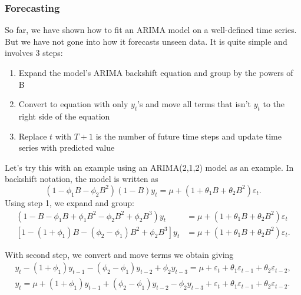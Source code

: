 \documentclass{article}
\begin{document}
  \subsubsection{Forecasting}
  So far, we have shown how to fit an ARIMA model on a well-defined time series. But we have not gone into how it forecasts unseen data. It is quite simple and involves 3 steps:
  \begin{enumerate}
    \item Expand the model's ARIMA backshift equation and group by the powers of B
    \item Convert to equation with only $y_t$'s and move all terms that isn't $y_t$ to the right side of the equation
    \item Replace $t$ with $T+1$ is the number of future time steps and update time series with predicted value
  \end{enumerate}
  Let's try this with an example using an ARIMA(2,1,2) model as an example. In backshift notation, the model is written as
  \begin{equation*}
    (1 - \phi_1B - \phi_2B^2)(1-B)y_t = \mu + (1 + \theta_1B + \theta_2B^2)\varepsilon_t.
  \end{equation*}
  Using step 1, we expand and group:
  \begin{align*}
    (1 - B - \phi_1B + \phi_1B^2 - \phi_2B^2 + \phi_2B^3)y_t &= \mu + (1 + \theta_1B + \theta_2B^2)\varepsilon_t\\
    [1 - (1 + \phi_1)B - (\phi_2 - \phi_1)B^2 + \phi_2B^3]y_t &= \mu + (1 + \theta_1B + \theta_2B^2)\varepsilon_t.
  \end{align*}

  With second step, we convert and move terms we obtain giving
  \begin{gather*}
    y_t - (1 + \phi_1)y_{t-1} - (\phi_2 - \phi_1)y_{t-2} + \phi_2y_{t-3} = \mu + \varepsilon_t + \theta_1\varepsilon_{t-1} + \theta_2\varepsilon_{t-2},\\
    y_t = \mu + (1 + \phi_1)y_{t-1} + (\phi_2 - \phi_1)y_{t-2} - \phi_2y_{t-3} + \varepsilon_t + \theta_1\varepsilon_{t-1} + \theta_2\varepsilon_{t-2}.
  \end{gather*}
\end{document}
